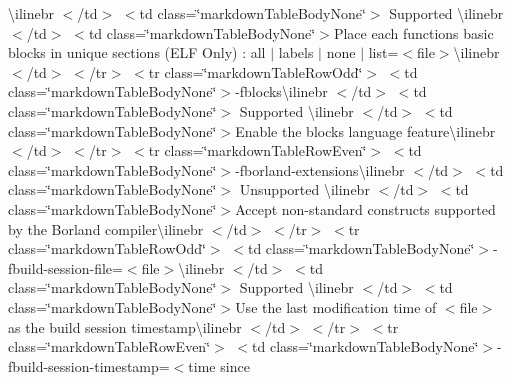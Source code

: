 \begin{longtabu}
{\ttfamily \textbackslash{}ilinebr \texorpdfstring{$<$}{<}/td\texorpdfstring{$>$}{>} \texorpdfstring{$<$}{<}td class=\char`\"{}markdown\+Table\+Body\+None\char`\"{}\texorpdfstring{$>$}{>} Supported \textbackslash{}ilinebr \texorpdfstring{$<$}{<}/td\texorpdfstring{$>$}{>} \texorpdfstring{$<$}{<}td class=\char`\"{}markdown\+Table\+Body\+None\char`\"{}\texorpdfstring{$>$}{>}}Place each function\textquotesingle{}s basic blocks in unique sections (ELF Only) \+: all $|$ labels $|$ none $|$ list=$<$file$>${\ttfamily \textbackslash{}ilinebr \texorpdfstring{$<$}{<}/td\texorpdfstring{$>$}{>} \texorpdfstring{$<$}{<}/tr\texorpdfstring{$>$}{>} \texorpdfstring{$<$}{<}tr class=\char`\"{}markdown\+Table\+Row\+Odd\char`\"{}\texorpdfstring{$>$}{>} \texorpdfstring{$<$}{<}td class=\char`\"{}markdown\+Table\+Body\+None\char`\"{}\texorpdfstring{$>$}{>}}-\/fblocks{\ttfamily \textbackslash{}ilinebr \texorpdfstring{$<$}{<}/td\texorpdfstring{$>$}{>} \texorpdfstring{$<$}{<}td class=\char`\"{}markdown\+Table\+Body\+None\char`\"{}\texorpdfstring{$>$}{>} Supported \textbackslash{}ilinebr \texorpdfstring{$<$}{<}/td\texorpdfstring{$>$}{>} \texorpdfstring{$<$}{<}td class=\char`\"{}markdown\+Table\+Body\+None\char`\"{}\texorpdfstring{$>$}{>}}Enable the \textquotesingle{}blocks\textquotesingle{} language feature{\ttfamily \textbackslash{}ilinebr \texorpdfstring{$<$}{<}/td\texorpdfstring{$>$}{>} \texorpdfstring{$<$}{<}/tr\texorpdfstring{$>$}{>} \texorpdfstring{$<$}{<}tr class=\char`\"{}markdown\+Table\+Row\+Even\char`\"{}\texorpdfstring{$>$}{>} \texorpdfstring{$<$}{<}td class=\char`\"{}markdown\+Table\+Body\+None\char`\"{}\texorpdfstring{$>$}{>}}-\/fborland-\/extensions{\ttfamily \textbackslash{}ilinebr \texorpdfstring{$<$}{<}/td\texorpdfstring{$>$}{>} \texorpdfstring{$<$}{<}td class=\char`\"{}markdown\+Table\+Body\+None\char`\"{}\texorpdfstring{$>$}{>} Unsupported \textbackslash{}ilinebr \texorpdfstring{$<$}{<}/td\texorpdfstring{$>$}{>} \texorpdfstring{$<$}{<}td class=\char`\"{}markdown\+Table\+Body\+None\char`\"{}\texorpdfstring{$>$}{>}}Accept non-\/standard constructs supported by the Borland compiler{\ttfamily \textbackslash{}ilinebr \texorpdfstring{$<$}{<}/td\texorpdfstring{$>$}{>} \texorpdfstring{$<$}{<}/tr\texorpdfstring{$>$}{>} \texorpdfstring{$<$}{<}tr class=\char`\"{}markdown\+Table\+Row\+Odd\char`\"{}\texorpdfstring{$>$}{>} \texorpdfstring{$<$}{<}td class=\char`\"{}markdown\+Table\+Body\+None\char`\"{}\texorpdfstring{$>$}{>}}-\/fbuild-\/session-\/file=$<$file$>${\ttfamily \textbackslash{}ilinebr \texorpdfstring{$<$}{<}/td\texorpdfstring{$>$}{>} \texorpdfstring{$<$}{<}td class=\char`\"{}markdown\+Table\+Body\+None\char`\"{}\texorpdfstring{$>$}{>} Supported \textbackslash{}ilinebr \texorpdfstring{$<$}{<}/td\texorpdfstring{$>$}{>} \texorpdfstring{$<$}{<}td class=\char`\"{}markdown\+Table\+Body\+None\char`\"{}\texorpdfstring{$>$}{>}}Use the last modification time of $<$file$>$ as the build session timestamp{\ttfamily \textbackslash{}ilinebr \texorpdfstring{$<$}{<}/td\texorpdfstring{$>$}{>} \texorpdfstring{$<$}{<}/tr\texorpdfstring{$>$}{>} \texorpdfstring{$<$}{<}tr class=\char`\"{}markdown\+Table\+Row\+Even\char`\"{}\texorpdfstring{$>$}{>} \texorpdfstring{$<$}{<}td class=\char`\"{}markdown\+Table\+Body\+None\char`\"{}\texorpdfstring{$>$}{>}}-\/fbuild-\/session-\/timestamp=$<$time since 
\end{longtabu}

